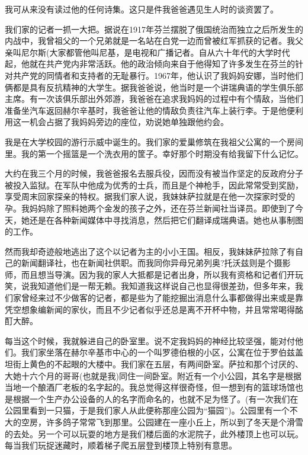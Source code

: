 我可从来没有读过他的任何诗集。这只是件我爸爸遇见生人时的谈资罢了。

我们家的记者一抓一大把。据说在1917年芬兰摆脱了俄国统治而独立之后所发生的内战中，我曾祖父的一个兄弟就是一名站在白党一边而曾被红军抓获的记者。我父亲叫尼尔斯(大家都管他叫尼基，是电视和广播记者。自从六十年代的大学时代起，他就在共产党内非常活跃。他的政治倾向来自于他得知了许多发生在芬兰的针对共产党的同情者和支持者的无耻暴行。1967年，他认识了我妈妈安娜，当时他们俩都是具有反抗精神的大学生。据我爸爸说，他当时是一个讲瑞典语的学生俱乐部主席。有一次该俱乐部出外郊游，我爸爸在追求我妈妈的过程中有个情敌，当他们准备坐汽车返回赫尔辛基时，我爸爸让他的情敌负责往汽车上装行李。于是他便利用这一机会占据了我妈妈旁边的座位，劝说她单独跟他约会。

我是在大学校园的游行示威中诞生的。我们家的爱巢修筑在我祖父公寓的一个房间里。我的第一个摇篮是一个洗衣用的筐子。幸好那个时期没有给我留下什么记忆。

大约在我三个月的时候，我爸爸报名去服兵役，因而没有被当作坚定的反政府分子被投入监狱。在军队中他成为优秀的士兵，而且是个神枪手，因此常常受到奖励，享受周末回家探亲的特权。据我们家人说，我妹妹萨拉就是在他一次探家时受的孕。我妈妈除了照料她两个金发的孩子之外，还在芬兰新闻社当译员。即使到了今天，她还是在各种新闻媒体中寻找消息，然后把它们翻译成瑞典语。她也从事制图的工作。

然而我却奇迹般地逃出了这个以记者为主的小小王国。相反，我妹妹萨拉除了有自己的新闻翻译社，也在新闻社供职。而我同你异母兄弟列奥?托沃兹则是个摄影师，而且想当导演。因为我的家人大抵都是记者出身，所以我有资格和记者们开玩笑，说我知道他们是一帮无赖。我知道我这样说自己也显得很差劲，但多年来，我们家曾经来过不少做客的记者，都是些为了能挖掘出消息什么事都做得出来或是靠凭空想象编新闻的家伙，而且不少记者似乎还总是离不开杯中物，并且常常喝得酩酊大醉。

每当这个时候，我就躲进自己的卧室里。说不定我妈妈的神经比较坚强，能对付他们。我们家坐落在赫尔辛基市中心的一个叫罗德伯根的小区，公寓在位于罗伯兹盖坦街上黄色的不起眼的大楼中。我们家在五层，有两间卧室。萨拉和那个讨厌的、大她十六个月的哥哥(也就是我)同住一间卧室。附近有一个小公园，其名字是根据当地一个酿酒厂老板的名字起的。我总觉得这样很奇怪，但一想到有的篮球场馆也是根据一个生产办公设备的人的名字而命名的，也就不足为怪了。(有一次我们在公园里看到一只猫，于是我们家人从此便称那座公园为“猫园”)。公园里有一个不大的空房，许多鸽子常常飞到那里。公园建在一座小丘上，所以到了冬天是个滑雪的去处。另一个可以玩耍的地方是我们楼后面的水泥院子，此外楼顶上也可以玩。每当我们玩捉迷藏时，顺着梯子爬五层登到楼顶上特别有意思。

